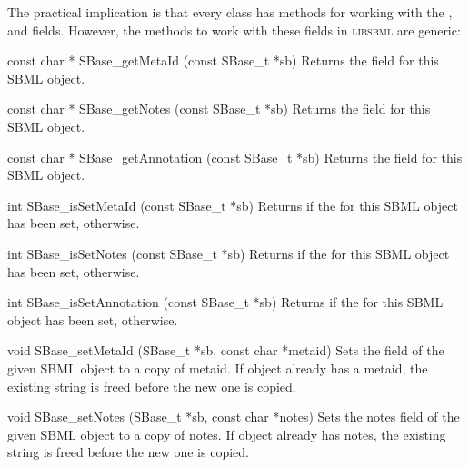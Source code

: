 \documentclass{sbmlmanual}
\newcommand{\libsbml}{\textsc{libsbml}}
\begin{document}
The practical implication is that every class has methods for working with
the ,  and  fields.
However, the methods to work with these fields in \libsbml{} are generic:


\begin{methoddef}{const char * SBase\_getMetaId (const SBase\_t *sb)}
  Returns the  field for this SBML object.
\end{methoddef}


\begin{methoddef}{const char * SBase\_getNotes (const SBase\_t *sb)}
  Returns the  field for this SBML object.
\end{methoddef}


\begin{methoddef}{const char * SBase\_getAnnotation (const SBase\_t *sb)}
  Returns the  field for this SBML object.
\end{methoddef}


\begin{methoddef}{int SBase\_isSetMetaId (const SBase\_t *sb)}
  Returns  if the  for this SBML object has been
  set,  otherwise.
\end{methoddef}


\begin{methoddef}{int SBase\_isSetNotes (const SBase\_t *sb)}
  Returns  if the  for this SBML object has been set,
   otherwise.
\end{methoddef}


\begin{methoddef}{int SBase\_isSetAnnotation (const SBase\_t *sb)}
  Returns  if the  for this SBML object has been
  set,  otherwise.
\end{methoddef}


\begin{methoddef}{void SBase\_setMetaId (SBase\_t *sb, const char *metaid)}
  Sets the  field of the given SBML object to a copy of
  metaid.  If object already has a metaid, the existing string is freed
  before the new one is copied.
\end{methoddef}


\begin{methoddef}{void SBase\_setNotes (SBase\_t *sb, const char *notes)}
  Sets the notes field of the given SBML object to a copy of notes.  If
  object already has notes, the existing string is freed before the new
  one is copied.
\end{methoddef}
\end{document}

